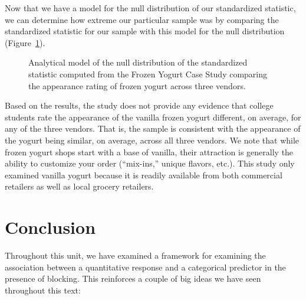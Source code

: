 \documentclass[
  letterpaper,
  DIV=11,
  numbers=noendperiod]{scrreprt}
\theoremstyle{definition}
\theoremstyle{definition}
\theoremstyle{plain}
\theoremstyle{remark}
\begin{document}
Now that we have a model for the null distribution of our standardized
statistic, we can determine how extreme our particular sample was by
comparing the standardized statistic for our sample with this model for
the null distribution (Figure~\ref{fig-blockrecap-null-distribution}).

\begin{figure}


\caption{\label{fig-blockrecap-null-distribution}Analytical model of the
null distribution of the standardized statistic computed from the Frozen
Yogurt Case Study comparing the appearance rating of frozen yogurt
across three vendors.}

\end{figure}%

Based on the results, the study does not provide any evidence that
college students rate the appearance of the vanilla frozen yogurt
different, on average, for any of the three vendors. That is, the sample
is consistent with the appearance of the yogurt being similar, on
average, across all three vendors. We note that while frozen yogurt
shops start with a base of vanilla, their attraction is generally the
ability to customize your order (``mix-ins,'' unique flavors, etc.).
This study only examined vanilla yogurt because it is readily available
from both commercial retailers as well as local grocery retailers.

\section{Conclusion}\label{conclusion-1}

Throughout this unit, we have examined a framework for examining the
association between a quantitative response and a categorical predictor
in the presence of blocking. This reinforces a couple of big ideas we
have seen throughout this text:
\end{document}
